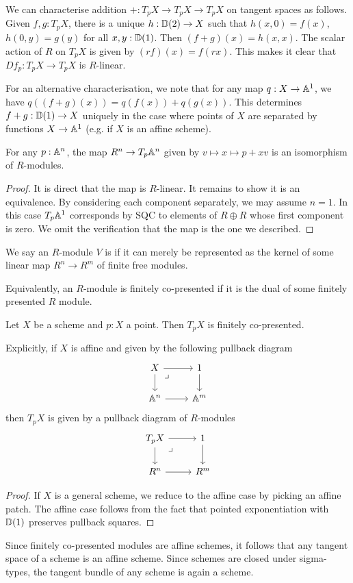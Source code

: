We can characterise addition $+ : T_p X \to T_p X \to T_p X$ on
tangent spaces as follows. Given $f, g : T_p X$,
there is a unique $h : \mathbb{D}(2) \to X$ such that
$h(x,0) = f(x)$, $h(0,y) = g(y)$ for all $x, y : \mathbb{D}(1)$.
Then $(f + g)(x) = h(x,x)$.
The scalar action of $R$ on $T_p X$ is given by
$(rf)(x) = f(rx)$.
This makes it clear that $Df_p : T_p X \to T_p X$ is $R$-linear.

For an alternative characterisation, we note that for any 
map $q : X \to \mathbb{A}^1$, we have
$q((f+g)(x)) = q(f(x)) + q(g(x))$. This determines $f + g : \mathbb{D}(1) \to X$
uniquely in the case where points of $X$ are separated by functions
$X \to \mathbb{A}^1$ (e.g. if $X$ is an affine scheme).

\begin{lemma}
For any $p : \mathbb{A}^n$, the map
$R^n \to T_p \mathbb{A}^n$ given by
$v \mapsto x \mapsto p + xv$ is an isomorphism of $R$-modules.
\end{lemma}
\begin{proof}
It is direct that the map is $R$-linear. It remains to show it is an equivalence.
By considering each component separately, we may assume $n = 1$.
In this case $T_p \mathbb{A}^1$ corresponds by SQC to elements of $R \oplus R$
whose first component is zero.
We omit the verification that the map is the one we described.
\end{proof}

\begin{definition}
We say an $R$-module $V$ is  
if it can merely be represented as the kernel of some linear 
map $R^n \to R^m$ of finite free modules.

Equivalently, an $R$-module is finitely co-presented if it is the dual
of some finitely presented $R$ module.
\end{definition}

\begin{lemma}
Let $X$ be a scheme and $p : X$ a point. Then $T_p X$ is finitely
co-presented.

Explicitly, if $X$ is affine and given by the following pullback
diagram 
\[
\begin{tikzcd}
X \arrow[r] \arrow[d] \arrow [dr,phantom,"\lrcorner",very near start] 
  & 1 \arrow[d] \\
\A^n \arrow[r] & \A^m
\end{tikzcd}
\]
then $T_p X$ is given by a pullback diagram of $R$-modules
\[
\begin{tikzcd}
T_p X \arrow[r] \arrow[d] \arrow [dr,phantom,"\lrcorner",very near start] 
  & 1 \arrow[d] \\
R^n \arrow[r] & R^m
\end{tikzcd}
\]
\end{lemma}
\begin{proof}
If $X$ is a general scheme, we reduce to the affine case by picking an affine patch.
The affine case follows from the fact that pointed exponentiation with $\mathbb{D}(1)$
preserves pullback squares.
\end{proof}
Since finitely co-presented modules are affine schemes, it follows that any tangent space
of a scheme is an affine scheme. Since schemes are closed under sigma-types,
the tangent bundle of any scheme is again a scheme.

